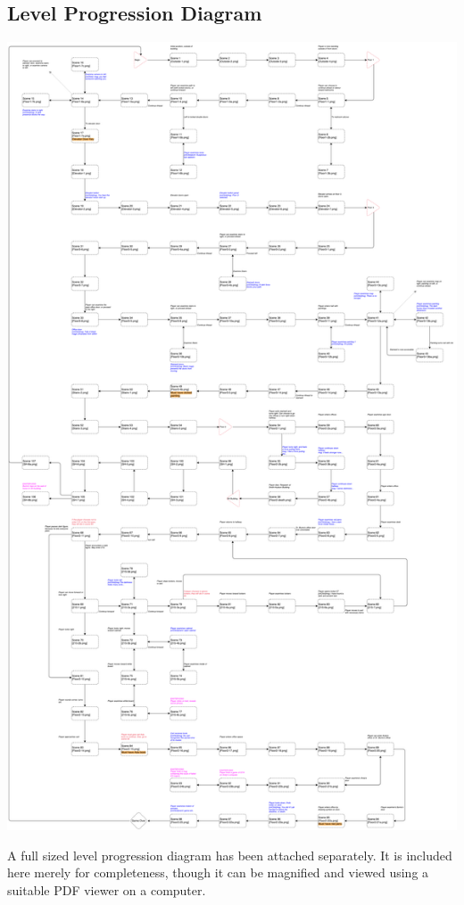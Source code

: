 \documentclass{article}
\begin{document}
	\subsection{Level Progression Diagram}
		\begin{center}
			\includegraphics[scale=0.15]{levelProgression}
		\end{center}
		A full sized level progression diagram has been attached separately. It is included here merely for completeness, though it can be magnified and viewed using a suitable PDF viewer on a computer. 
		
\end{document}
